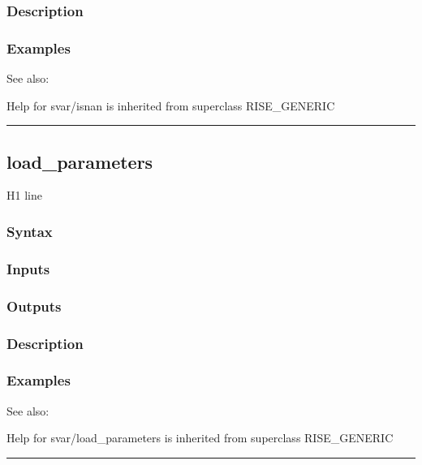 \documentclass[letterpaper,10pt,english]{sphinxmanual}
\begin{document}
\subsubsection{Description}
\label{classes/models/@svar/svar:id40}

\subsubsection{Examples}
\label{classes/models/@svar/svar:id41}
See also:

Help for svar/isnan is inherited from superclass RISE\_GENERIC


\bigskip\hrule{}\bigskip



\subsection{load\_parameters}
\label{classes/models/@svar/svar:id42}\label{classes/models/@svar/svar:load-parameters}
H1 line


\subsubsection{Syntax}
\label{classes/models/@svar/svar:id43}

\subsubsection{Inputs}
\label{classes/models/@svar/svar:id44}

\subsubsection{Outputs}
\label{classes/models/@svar/svar:id45}

\subsubsection{Description}
\label{classes/models/@svar/svar:id46}

\subsubsection{Examples}
\label{classes/models/@svar/svar:id47}
See also:

Help for svar/load\_parameters is inherited from superclass RISE\_GENERIC


\bigskip\hrule{}\bigskip
\end{document}
